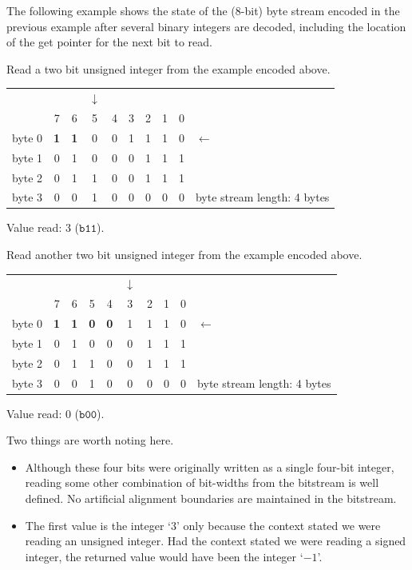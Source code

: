 \documentclass[9pt,letterpaper]{book}
\newcommand{\bin}[1]{\ensuremath{\mathtt{b#1}}}
\numberwithin{equation}{chapter}
\numberwithin{figure}{chapter}
\numberwithin{table}{chapter}
\begin{document}
The following example shows the state of the (8-bit) byte stream encoded in the
 previous example after several binary integers are decoded, including the
 location of the get pointer for the next bit to read.

Read a two bit unsigned integer from the example encoded above.

\begin{tabular}{r|ccccccccl}
\multicolumn{1}{r}{} &&&$\downarrow$&&&&&&              \\
         & 7 & 6 & 5 & 4 & 3 & 2 & 1 & 0 &              \\\cline{1-9}
byte 0   & \textbf{1} & \textbf{1} & 0 & 0 & 1 & 1 & 1 & 0 & $\leftarrow$ \\
byte 1   & 0 & 1 & 0 & 0 & 0 & 1 & 1 & 1 &              \\
byte 2   & 0 & 1 & 1 & 0 & 0 & 1 & 1 & 1 &              \\
byte 3   & 0 & 0 & 1 & 0 & 0 & 0 & 0 & 0 &
byte stream length: 4 bytes
\end{tabular}
\vspace{\baselineskip}

Value read: 3 (\bin{11}).

Read another two bit unsigned integer from the example encoded above.

\begin{tabular}{r|ccccccccl}
\multicolumn{1}{r}{} &&&&&$\downarrow$&&&&              \\
         & 7 & 6 & 5 & 4 & 3 & 2 & 1 & 0 &              \\\cline{1-9}
byte 0   & \textbf{1} & \textbf{1} & \textbf{0} & \textbf{0} &
                           1 & 1 & 1 & 0 & $\leftarrow$ \\
byte 1   & 0 & 1 & 0 & 0 & 0 & 1 & 1 & 1 &              \\
byte 2   & 0 & 1 & 1 & 0 & 0 & 1 & 1 & 1 &              \\
byte 3   & 0 & 0 & 1 & 0 & 0 & 0 & 0 & 0 &
byte stream length: 4 bytes
\end{tabular}
\vspace{\baselineskip}

Value read: 0 (\bin{00}).

Two things are worth noting here.
\begin{itemize}
\item
Although these four bits were originally written as a single four-bit integer,
 reading some other combination of bit-widths from the bitstream is well
 defined.
No artificial alignment boundaries are maintained in the bitstream.
\item
The first value is the integer `$3$' only because the context stated we were
 reading an unsigned integer.
Had the context stated we were reading a signed integer, the returned value
 would have been the integer `$-1$'.
\end{itemize}
\end{document}
